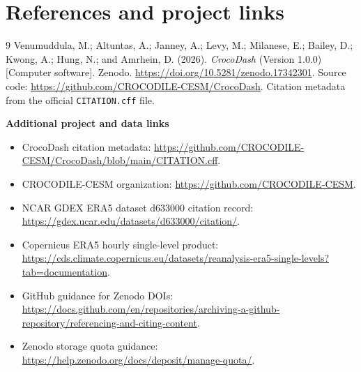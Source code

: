 \documentclass[11pt]{article}
\newcommand{\code}[1]{\texttt{#1}}
\begin{document}
\section*{References and project links}

\begin{thebibliography}{9}
Venumuddula, M.; Altuntas, A.; Janney, A.; Levy, M.; Milanese, E.; Bailey, D.; Kwong, A.; Hung, N.; and Amrhein, D. (2026). \textit{CrocoDash} (Version 1.0.0) [Computer software]. Zenodo. \href{https://doi.org/10.5281/zenodo.17342301}{https://doi.org/10.5281/zenodo.17342301}. Source code: \url{https://github.com/CROCODILE-CESM/CrocoDash}. Citation metadata from the official \code{CITATION.cff} file.
\end{thebibliography}

\noindent\textbf{Additional project and data links}
\begin{itemize}
  \item CrocoDash citation metadata: \url{https://github.com/CROCODILE-CESM/CrocoDash/blob/main/CITATION.cff}.
  \item CROCODILE-CESM organization: \url{https://github.com/CROCODILE-CESM}.
  \item NCAR GDEX ERA5 dataset d633000 citation record: \url{https://gdex.ucar.edu/datasets/d633000/citation/}.
  \item Copernicus ERA5 hourly single-level product: \url{https://cds.climate.copernicus.eu/datasets/reanalysis-era5-single-levels?tab=documentation}.
  \item GitHub guidance for Zenodo DOIs: \url{https://docs.github.com/en/repositories/archiving-a-github-repository/referencing-and-citing-content}.
  \item Zenodo storage quota guidance: \url{https://help.zenodo.org/docs/deposit/manage-quota/}.
\end{itemize}
\end{document}
